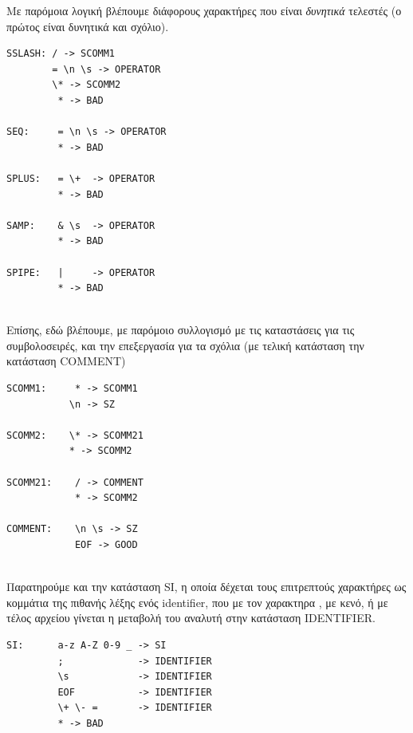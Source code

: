 \documentclass[14pt]{extarticle}
\begin{document}
\clearpage
Με παρόμοια λογική βλέπουμε διάφορους χαρακτήρες που είναι \emph{δυνητικά} τελεστές (ο πρώτος είναι δυνητικά και σχόλιο).
    \begin{lstlisting}
SSLASH: / -> SCOMM1
        = \n \s -> OPERATOR
        \* -> SCOMM2
         * -> BAD
    
SEQ:     = \n \s -> OPERATOR
         * -> BAD

SPLUS:   = \+  -> OPERATOR
         * -> BAD

SAMP:    & \s  -> OPERATOR
         * -> BAD

SPIPE:   |     -> OPERATOR
         * -> BAD
    \end{lstlisting}
\\   
Επίσης, εδώ βλέπουμε, με παρόμοιο συλλογισμό με τις καταστάσεις για τις συμβολοσειρές, και την επεξεργασία για τα σχόλια (με τελική κατάσταση την κατάσταση \textlatin{COMMENT})
    \begin{lstlisting}
SCOMM1:     * -> SCOMM1
           \n -> SZ

SCOMM2:    \* -> SCOMM21
           * -> SCOMM2
            
SCOMM21:    / -> COMMENT
            * -> SCOMM2

COMMENT:    \n \s -> SZ  
            EOF -> GOOD
    \end{lstlisting}
\\
Παρατηρούμε και την κατάσταση \textlatin{SI}, η οποία δέχεται τους επιτρεπτούς χαρακτήρες ως κομμάτια της πιθανής λέξης ενός \textlatin{identifier}, που με τον χαρακτηρα \boxed{;}, με κενό, ή με τέλος αρχείου γίνεται η μεταβολή του αναλυτή στην κατάσταση \textlatin{IDENTIFIER}.
    \begin{lstlisting}
SI:      a-z A-Z 0-9 _ -> SI
         ;             -> IDENTIFIER
         \s            -> IDENTIFIER 
         EOF           -> IDENTIFIER
         \+ \- =       -> IDENTIFIER
         * -> BAD
    \end{lstlisting}
\end{document}
